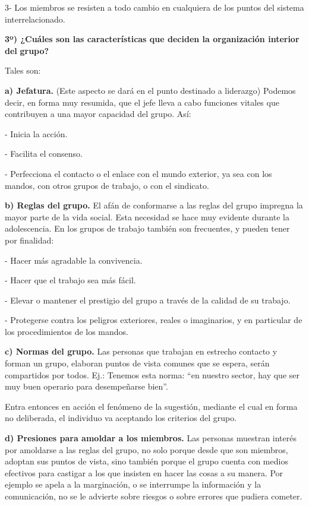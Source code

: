 3- Los miembros se resisten a todo cambio en cualquiera de los puntos del sistema interrelacionado.

\textbf{3º) ¿Cuáles son las características que deciden la organización interior del} \textbf{grupo?}

Tales son:

\textbf{a) Jefatura. }(Este aspecto se dará en el punto destinado a liderazgo) Podemos decir, en forma muy resumida, que el jefe lleva a cabo funciones vitales que contribuyen a una mayor capacidad del grupo. Así:

- Inicia la acción.



- Facilita el consenso.

- Perfecciona el contacto o el enlace con el mundo exterior, ya sea con los mandos, con otros grupos de trabajo, o con el sindicato.

\textbf{b) Reglas del grupo. }El afán de conformarse a las reglas del grupo impregna la mayor parte de la vida social. Esta necesidad se hace muy evidente durante la adolescencia. En los grupos de trabajo también son frecuentes, y pueden tener por finalidad:

- Hacer más agradable la convivencia.

- Hacer que el trabajo sea más fácil.

- Elevar o mantener el prestigio del grupo a través de la calidad de su trabajo.

- Protegerse contra los peligros exteriores, reales o imaginarios, y en particular de los procedimientos de los mandos.

\textbf{c) Normas del grupo. }Las personas que trabajan en estrecho contacto y forman un grupo, elaboran puntos de vista comunes que se espera, serán compartidos por todos. Ej.: Tenemos esta norma: “en nuestro sector, hay que ser muy buen operario para desempeñarse bien”.

Entra entonces en acción el fenómeno de la sugestión, mediante el cual en forma no deliberada, el individuo va aceptando los criterios del grupo.

\textbf{d) Presiones para amoldar a los miembros. }Las personas muestran interés por amoldarse a las reglas del grupo, no solo porque desde que son miembros, adoptan sus puntos de vista, sino también porque el grupo cuenta con medios efectivos para castigar a los que insisten en hacer las cosas a su manera. Por ejemplo se apela a la marginación, o se interrumpe la información y la comunicación, no se le advierte sobre riesgos o sobre errores que pudiera cometer.

